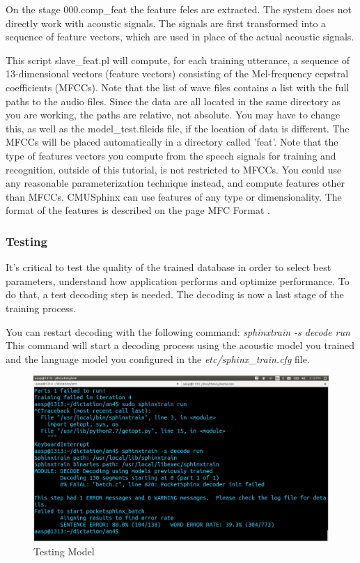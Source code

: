 \documentclass[12pt,a4paper,oldfontcommands]{memoir}
\begin{document}
 On the stage 000.comp\_feat the feature feles are extracted. The system does not directly work with acoustic signals. The signals are first transformed into a sequence of feature vectors, which are used in place of the actual acoustic signals.

This script slave\_feat.pl will compute, for each training utterance, a sequence of 13-dimensional vectors (feature vectors) consisting of the Mel-frequency cepstral coefficients (MFCCs). Note that the list of wave files contains a list with the full paths to the audio files. Since the data are all located in the same directory as you are working, the paths are relative, not absolute. You may have to change this, as well as the model\_test.fileids file, if the location of data is different. The MFCCs will be placed automatically in a directory called 'feat'. Note that the type of features vectors you compute from the speech signals for training and recognition, outside of this tutorial, is not restricted to MFCCs. You could use any reasonable parameterization technique instead, and compute features other than MFCCs. CMUSphinx can use features of any type or dimensionality. The format of the features is described on the page MFC Format . 

\subsubsection{Testing}
 It's critical to test the quality of the trained database in order to select best parameters, understand how application performs and optimize performance. To do that, a test decoding step is needed. The decoding is now a last stage of the training process.

You can restart decoding with the following command: 
\textit{sphinxtrain -s decode run}
 This command will start a decoding process using the acoustic model you trained and the language model you configured in the \textit{etc/sphinx\_train.cfg} file.

\begin{figure}[h]
    \centering
    \includegraphics[scale=0.3]{Screenshot4}
    \caption{Testing Model}
\end{figure}
\end{document}
